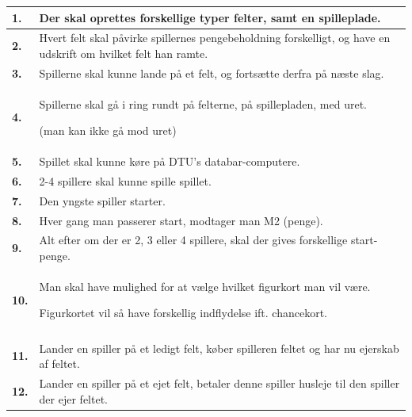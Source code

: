 \begin{tabular}{| l |p{13cm}|}

    \hline
    \textbf{1.} 
    &
    Der skal oprettes forskellige typer felter, samt en spilleplade. \\
    
    \hline
    \textbf{2.} 
    &
    Hvert felt skal påvirke spillernes pengebeholdning forskelligt, og have en udskrift om hvilket felt han ramte. \\
    
    \hline
    \textbf{3.} 
    &
    Spillerne skal kunne lande på et felt, og fortsætte derfra på næste slag. \\
    
    \hline
    \textbf{4.} 
    &
    Spillerne skal gå i ring rundt på felterne, på spillepladen, med uret. 

    (man kan ikke gå mod uret) \\
    
    \hline
    \textbf{5.} 
    &
    Spillet skal kunne køre på DTU’s databar-computere. \\
    
    \hline
    \textbf{6.} 
    &
    2-4 spillere skal kunne spille spillet. \\

    \hline
    \textbf{7.} 
    &
    Den yngste spiller starter. \\
      
    \hline
    \textbf{8.}
    &
    Hver gang man passerer start, modtager man M2 (penge). \\
      
    \hline
    \textbf{9.}
    &
    Alt efter om der er 2, 3 eller 4 spillere, skal der gives forskellige start-penge. \\

    \hline
    \textbf{10.}
    &
    Man skal have mulighed for at vælge hvilket figurkort man vil være.
    
    Figurkortet vil så have forskellig indflydelse ift. chancekort. \\ \\
      
    \hline
    \textbf{11.}
    &
    Lander en spiller på et ledigt felt, køber spilleren feltet og har nu ejerskab af feltet. \\
      
    \hline
    \textbf{12.}
    &
    Lander en spiller på et ejet felt, betaler denne spiller husleje til den spiller der ejer feltet. \\
      

\end{tabular}
